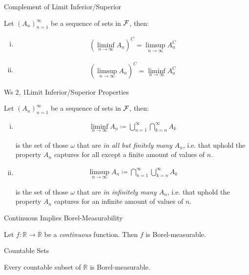 \begin{proposition}{}{Complement of Limit Inferior/Superior}

    Let $(A_n)_{n=1}^{\infty}$ be a sequence of sets in $\mathcal{F}$, then:

        \begin{enumerate}[(i)]
            \item
                \begin{align*}
                    \left(\liminf_{n \to \infty} A_n\right)^C = \limsup_{n \to \infty} A_n^C
                \end{align*}
            \item
                \begin{align*}
                    \left(\limsup_{n \to \infty} A_n\right)^C = \liminf_{n \to \infty} A_n^C
                \end{align*}
        \end{enumerate}

\end{proposition}

\begin{exercise}{Ws 2, 1}{Limit Inferior/Superior Properties}

       Let $(A_n)_{n=1}^{\infty}$ be a sequence of sets in $\mathcal{F}$, then:

        \begin{enumerate}[(i)]
            \item
                \begin{align*}
                    \liminf_{n \to \infty} A_n \coloneqq \bigcup_{n = 1}^{\infty}\bigcap_{k = n}^{\infty} A_k
                \end{align*}

                is the set of those $\omega$ that are \emph{in all but finitely many $A_n$}, i.e. that uphold the property $A_n$ captures for all except a finite amount of values of $n$.
            \item
                \begin{align*}
                    \limsup_{n \to \infty} A_n \coloneqq \bigcap_{n = 1}^{\infty}\bigcup_{k = n}^{\infty} A_k
                \end{align*}

                is the set of those $\omega$ that are \emph{in infinitely many $A_n$}, i.e. that uphold the property $A_n$ captures for an infinite amount of values of $n$.
        \end{enumerate} 

\end{exercise}

\begin{proposition}{}{Continuous Implies Borel-Measurability}

    Let $f: \mathbb{R} \to \overline{\mathbb{R}}$ be a \emph{continuous} function. Then $f$ is Borel-measurable.

\end{proposition}

\begin{proposition}{}{Countable Sets}

    Every countable subset of $\mathbb{R}$ is Borel-measurable.

\end{proposition}
